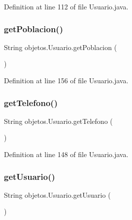 Definition at line 112 of file Usuario.\+java.

\mbox{\label{classobjetos_1_1_usuario_ac5bbdb911746e90bb9d0be80195eb425}} 
\subsubsection{\texorpdfstring{get\+Poblacion()}{getPoblacion()}}
{\footnotesize\ttfamily String objetos.\+Usuario.\+get\+Poblacion (\begin{DoxyParamCaption}{ }\end{DoxyParamCaption})}



Definition at line 156 of file Usuario.\+java.

\mbox{\label{classobjetos_1_1_usuario_a61da31ecd6448c2064a7dcd276d71754}} 
\subsubsection{\texorpdfstring{get\+Telefono()}{getTelefono()}}
{\footnotesize\ttfamily String objetos.\+Usuario.\+get\+Telefono (\begin{DoxyParamCaption}{ }\end{DoxyParamCaption})}



Definition at line 148 of file Usuario.\+java.

\mbox{\label{classobjetos_1_1_usuario_a091d44abe53530995ec78cde4c574a1d}} 
\subsubsection{\texorpdfstring{get\+Usuario()}{getUsuario()}}
{\footnotesize\ttfamily String objetos.\+Usuario.\+get\+Usuario (\begin{DoxyParamCaption}{ }\end{DoxyParamCaption})}



